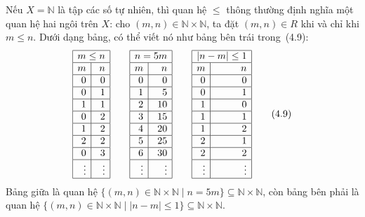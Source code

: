 Nếu $X=\mathbb{N}$ là tập các số tự nhiên, thì quan hệ $\le$ thông thường định nghĩa một quan hệ hai ngôi trên $X$: cho $(m,n)\in\mathbb{N}\times\mathbb{N}$, ta đặt $(m,n)\in R$ khi và chỉ khi $m\le n$. Dưới dạng bảng, có thể viết nó như bảng bên trái trong~(4.9):
\begin{equation}
\begin{array}{|r|r|}\hline
\multicolumn{2}{|c|}{m\le n}\\\hline m&n\\\hline
0&0\\\hline 0&1\\\hline 1&1\\\hline 0&2\\\hline
1&2\\\hline 2&2\\\hline 0&3\\\hline \vdots&\vdots\\\hline
\end{array}\qquad
\begin{array}{|r|r|}\hline
\multicolumn{2}{|c|}{n=5m}\\\hline m&n\\\hline
0&0\\\hline 1&5\\\hline 2&10\\\hline 3&15\\\hline
4&20\\\hline 5&25\\\hline 6&30\\\hline \vdots&\vdots\\\hline
\end{array}\qquad
\begin{array}{|r|r|}\hline
\multicolumn{2}{|c|}{|n-m|\le1}\\\hline m&n\\\hline
0&0\\\hline 0&1\\\hline 1&0\\\hline 1&1\\\hline
1&2\\\hline 2&1\\\hline 2&2\\\hline \vdots&\vdots\\\hline
\end{array}
\tag{4.9}
\end{equation}
Bảng giữa là quan hệ $\{(m,n)\in\mathbb{N}\times\mathbb{N}\mid n=5m\}\subseteq\mathbb{N}\times\mathbb{N}$, còn bảng bên phải là quan hệ $\{(m,n)\in\mathbb{N}\times\mathbb{N}\mid|n-m|\le1\}\subseteq\mathbb{N}\times\mathbb{N}$.

